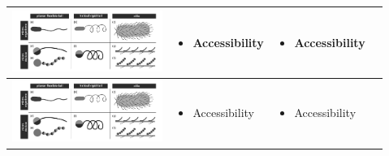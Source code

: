 \documentclass[a4paper,11pt]{article}
\begin{document}
\begin{sloppypar}
\begin{table}[h!]
\begin{tabular}{ c  m{3cm}  m{3cm} m{3cm} }
 \begin{minipage}{.3\textwidth}
      \includegraphics[width=\linewidth, height=20mm]{cilia}
    \end{minipage}
    &
      \begin{itemize}
        \item Accessibility
      
      \end{itemize}
    & 
      \begin{itemize}
        \item Accessibility

      \end{itemize}
    \\ \hline


 \begin{minipage}{.3\textwidth}
      \includegraphics[width=\linewidth, height=20mm]{cilia}
    \end{minipage}
    &
      \begin{itemize}
        \item Accessibility
     
      \end{itemize}
    & 
      \begin{itemize}
        \item Accessibility
     
      \end{itemize}
    \\ \hline




\end{tabular}
\end{table}
\end{sloppypar}
\end{document}
